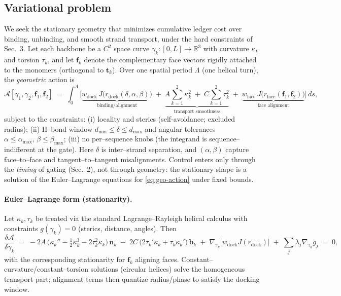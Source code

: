 \documentclass[11pt]{article}
\begin{document}
\subsection{Variational problem}
We seek the stationary geometry that minimizes cumulative ledger cost over binding, unbinding, and smooth strand transport, under the hard constraints of Sec.~3. Let each backbone be a $C^2$ space curve $\gamma_k:[0,L]\!\to\!\mathbb{R}^3$ with curvature $\kappa_k$ and torsion $\tau_k$, and let $\mathbf{f}_k$ denote the complementary face vectors rigidly attached to the monomers (orthogonal to $\mathbf{t}_k$). Over one spatial period $\Lambda$ (one helical turn), the \emph{geometric} action is
\begin{equation}\label{eq:geo-action}
\mathcal{A}[\gamma_1,\gamma_2,\mathbf{f}_1,\mathbf{f}_2]
\;=\;
\int_0^\Lambda
\Big[
\underbrace{w_{\mathrm{dock}}\,J\!\big(r_{\mathrm{dock}}(\delta,\alpha,\beta)\big)}_{\text{binding/alignment}}
\;+\;
\underbrace{A\!\sum_{k=1}^2 \kappa_k^2 \;+\; C\!\sum_{k=1}^2 \tau_k^2}_{\text{transport smoothness}}
\;+\;
\underbrace{w_{\mathrm{face}}\,J\!\big(r_{\mathrm{face}}(\mathbf{f}_1,\mathbf{f}_2)\big)}_{\text{face alignment}}
\Big]\,ds,
\end{equation}
subject to the constraints: (i) locality and sterics (self-avoidance; excluded radius); (ii) H–bond window $d_{\min}\!\le\!\delta\!\le\!d_{\max}$ and angular tolerances $\alpha\!\le\!\alpha_{\max},\,\beta\!\le\!\beta_{\max}$; (iii) no per–sequence knobs (the integrand is sequence–indifferent at the gate). Here $\delta$ is inter–strand separation, and $(\alpha,\beta)$ capture face–to–face and tangent–to–tangent misalignments. Control enters only through the \emph{timing} of gating (Sec.~2), not through geometry: the stationary shape is a solution of the Euler–Lagrange equations for \eqref{eq:geo-action} under fixed bounds.

\paragraph{Euler–Lagrange form (stationarity).}
Let $\kappa_k,\tau_k$ be treated via the standard Lagrange–Rayleigh helical calculus with constraints $g(\gamma_k)=0$ (sterics, distance, angles). Then
\[
\frac{\delta \mathcal{A}}{\delta \gamma_k}
\;=\;
-2A\,\big(\kappa_k''-\tfrac12\kappa_k^3-2\tau_k^2\kappa_k\big)\,\mathbf{n}_k
\;-\;2C\,\big(2\tau_k'\kappa_k+\tau_k\kappa_k'\big)\,\mathbf{b}_k
\;+\;\nabla_{\gamma_k}\!\big[w_{\mathrm{dock}}J(r_{\mathrm{dock}})\big]
\;+\;\sum_j\lambda_j \nabla_{\gamma_k} g_j
\;=\;0,
\]
with the corresponding stationarity for $\mathbf{f}_k$ aligning faces. Constant–curvature/constant–torsion solutions (circular helices) solve the homogeneous transport part; alignment terms then quantize radius/phase to satisfy the docking window.
\end{document}
